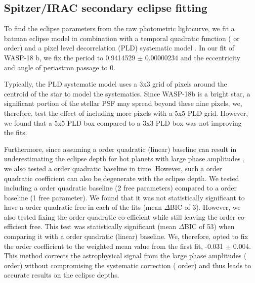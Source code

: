 \subsection{Spitzer/IRAC secondary eclipse fitting}
\label{P3:sec:fitting}

To find the eclipse parameters from the raw photometric lightcurve, we fit a batman eclipse model \citep{Kreidberg2015} in combination with a temporal quadratic function ( or  order) and a pixel level decorrelation (PLD) systematic model \citep{Deming2015}. In our fit of WASP-18 b, we fix the period to 0.9414529 $\pm$ 0.00000234 \citep{Pearson2019} and the eccentricity and angle of periastron passage to 0.

Typically, the PLD systematic model uses a 3x3 grid of pixels around the centroid of the star to model the systematics. Since WASP-18b is a bright star, a significant portion of the stellar PSF may spread beyond these nine pixels, we, therefore, test the effect of including more pixels with a 5x5 PLD grid. However, we found that a 5x5 PLD box compared to a 3x3 PLD box was not improving the fits.

Furthermore, since assuming a  order quadratic (linear) baseline can result in underestimating the eclipse depth for hot planets with large phase amplitudes \citep[e.g.,][]{Bell2019}, we also tested a  order quadratic baseline in time. However, such a  order quadratic coefficient can also be degenerate with the eclipse depth. We tested including a  order quadratic baseline (2 free parameters) compared to a  order baseline (1 free parameter). We found that it was not statistically significant to have a  order quadratic free in each of the fits (mean $\Delta$BIC of 3). However, we also tested fixing the  order quadratic co-efficient while still leaving the  order co-efficient free. This test was statistically significant (mean $\Delta$BIC of 53) when comparing it with a  order quadratic (linear) baseline. We, therefore, opted to fix the  order coefficient to the weighted mean value from the first fit, -0.031 $\pm$ 0.004. This method corrects the astrophysical signal from the large phase amplitudes ( order) without compromising the systematic correction ( order) and thus leads to accurate results on the eclipse depths.


